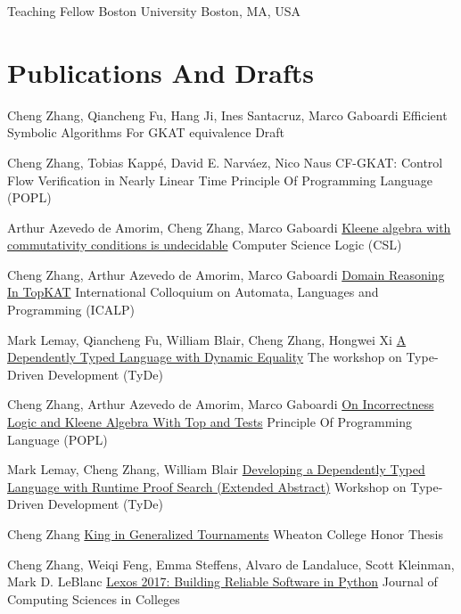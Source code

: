 \documentclass[10pt]{moderncv}        %
\let\oldsection=\section
\renewcommand{\section}{%
  \needspace{\baselineskip}
  \oldsection
}
\begin{document}
{Teaching Fellow}
{Boston University}
{Boston, MA, USA}{}
{%
}

\section{Publications And Drafts}

{Cheng Zhang, Qiancheng Fu, Hang Ji, Ines Santacruz, Marco Gaboardi}
{Efficient Symbolic Algorithms For GKAT equivalence}
{Draft}
{}{}

{Cheng Zhang, Tobias Kappé, David E. Narváez, Nico Naus}
{CF-GKAT: Control Flow Verification in Nearly Linear Time}
{Principle Of Programming Language (POPL)}
{}{}

{Arthur Azevedo de Amorim, Cheng Zhang, Marco Gaboardi}
{\href{https://hal.science/hal-04534715/}{Kleene algebra with commutativity conditions is undecidable}}
{Computer Science Logic (CSL)}
{}{}

{Cheng Zhang, Arthur Azevedo de Amorim, Marco Gaboardi}
{\href{https://arxiv.org/abs/2404.18417}{Domain Reasoning In TopKAT}}
{International Colloquium on Automata, Languages and Programming (ICALP)}
{}{}

{Mark Lemay, Qiancheng Fu, William Blair, Cheng Zhang, Hongwei Xi}
{\href{https://doi.org/10.1145/3609027.3609407}{A Dependently Typed Language with Dynamic Equality}}
{The workshop on Type-Driven Development (TyDe)}
{}{}

{Cheng Zhang, Arthur Azevedo de Amorim, Marco Gaboardi}
{\href{https://arxiv.org/abs/2108.07707}{On Incorrectness Logic and Kleene Algebra With Top and Tests}}
{Principle Of Programming Language (POPL)}
{}{}

{Mark Lemay, Cheng Zhang, William Blair}
{\href{https://icfp20.sigplan.org/details/tyde-2020-papers/7/Developing-a-Dependently-Typed-Language-with-Runtime-Proof-Search-Extended-Abstract-}
{Developing a Dependently Typed Language with Runtime Proof Search (Extended Abstract)}}
{Workshop on Type-Driven Development (TyDe)}
{}{}

{Cheng Zhang}
{\href{http://hdl.handle.net/11040/24570}{King in Generalized Tournaments}}
{Wheaton College Honor Thesis}
{}{}

{Cheng Zhang, Weiqi Feng, Emma Steffens, Alvaro de Landaluce, Scott Kleinman, Mark D. LeBlanc}
{\href{https://dl.acm.org/doi/10.5555/3205191.3205205}{Lexos 2017: Building Reliable Software in Python}}
{Journal of Computing Sciences in Colleges}
{}{}
\end{document}
